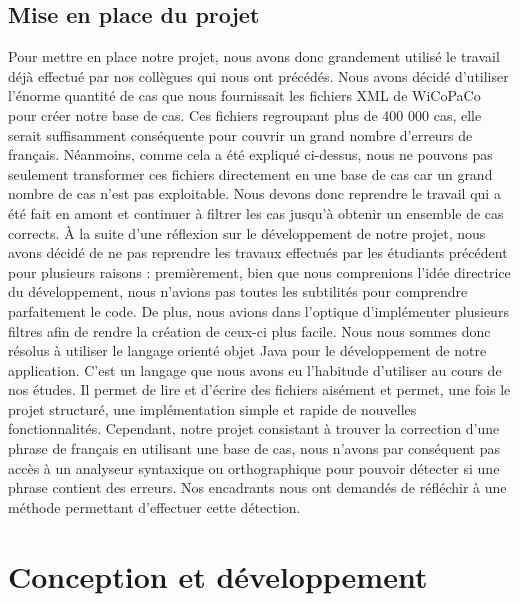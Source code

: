 \documentclass[11pt]{article}
\begin{document}
\subsection{Mise en place du projet}
Pour mettre en place notre projet, nous avons donc grandement utilis\'{e} le travail d\'{e}j\`{a} effectu\'{e} par nos coll\`{e}gues qui nous ont pr\'{e}c\'{e}d\'{e}s. Nous avons d\'{e}cid\'{e} d'utiliser l'\'{e}norme quantit\'{e} de cas que nous fournissait les fichiers XML de WiCoPaCo pour cr\'{e}er notre base de cas. Ces fichiers regroupant plus de 400 000 cas, elle serait suffisamment cons\'{e}quente pour couvrir un grand nombre d'erreurs de fran\c{c}ais. N\'{e}anmoins, comme cela a \'{e}t\'{e} expliqu\'{e} ci-dessus, nous ne pouvons pas seulement transformer ces fichiers directement en une base de cas car un grand nombre de cas n'est pas exploitable. Nous devons donc reprendre le travail qui a \'{e}t\'{e} fait en amont et continuer \`{a} filtrer les cas jusqu'\`{a} obtenir un ensemble de cas corrects.
\newline
\newline
\`{A} la suite d'une r\'{e}flexion sur le d\'{e}veloppement de notre projet, nous avons d\'{e}cid\'{e} de ne pas reprendre les travaux effectu\'{e}s par les \'{e}tudiants pr\'{e}c\'{e}dent pour plusieurs raisons : premi\`{e}rement, bien que nous comprenions l'id\'{e}e directrice du d\'{e}veloppement, nous n'avions pas toutes les subtilit\'{e}s pour comprendre parfaitement le code. De plus, nous avions dans l'optique d'impl\'{e}menter plusieurs filtres afin de rendre la cr\'{e}ation de ceux-ci plus facile. Nous nous sommes donc r\'{e}solus \`{a} utiliser le langage orient\'{e} objet Java pour le d\'{e}veloppement de notre application. C'est un langage que nous avons eu l'habitude d'utiliser au cours de nos \'{e}tudes. Il permet de lire et d'\'{e}crire des fichiers ais\'{e}ment et permet, une fois le projet structur\'{e}, une impl\'{e}mentation simple et rapide de nouvelles fonctionnalit\'{e}s.
\newline
\newline
Cependant, notre projet consistant \`{a} trouver la correction d'une phrase de fran\c{c}ais en utilisant une base de cas, nous n'avons par cons\'{e}quent pas acc\`{e}s \`{a} un analyseur syntaxique ou orthographique pour pouvoir d\'{e}tecter si une phrase contient des erreurs. Nos encadrants nous ont demand\'{e}s de r\'{e}fl\'{e}chir \`{a} une m\'{e}thode permettant d'effectuer cette d\'{e}tection.


\section{Conception et d\'{e}veloppement}
\end{document}
